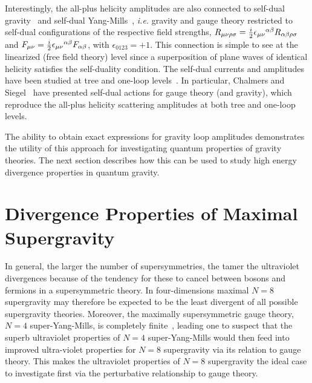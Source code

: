 Interestingly, the all-plus helicity amplitudes are also connected to
self-dual gravity~\cite{Plebanski75,Duff79,Plebanski96} and self-dual
Yang-Mills~\cite{Yang77,DuffIsham80,Lenzov87,Lenzov88,Bardeen96,
Cangemi,ChalmersSiegel}, {\it i.e.} gravity and gauge theory
restricted to self-dual configurations of the respective field
strengths, $R_{\mu\nu\rho\sigma} =
{i\over2}\epsilon_{\mu\nu}{}^{\alpha\beta} R_{\alpha\beta \rho\sigma}$
and $F_{\mu\nu} = {i\over 2} \epsilon_{\mu\nu}{}^{\alpha\beta}
F_{\alpha\beta}$, with $\epsilon_{0123} = +1$.  This connection is
simple to see at the linearized (free field theory) level since a
superposition of plane waves of identical helicity satisfies the
self-duality condition.  The self-dual currents and amplitudes have
been studied at tree and one-loop
levels~\cite{DuffIsham80,Bardeen96,Cangemi,ChalmersSiegel}.  In
particular, Chalmers and Siegel~\cite{ChalmersSiegel} have presented
self-dual actions for gauge theory (and gravity), which reproduce the
all-plus helicity scattering amplitudes at both tree and one-loop
levels.

The ability to obtain exact expressions for gravity loop amplitudes
demonstrates the utility of this approach for investigating quantum
properties of gravity theories.  The next section describes how this
can be used to study high energy divergence properties 
in quantum gravity.


\newpage 
\section{Divergence Properties of Maximal Supergravity}
\label{section:divergence_properties}

In general, the larger the number of supersymmetries, the tamer the
ultraviolet divergences because of the tendency for these to cancel
between bosons and fermions in a supersymmetric theory.  In
four-dimensions maximal $N=8$ supergravity may therefore be expected
to be the least divergent of all possible supergravity
theories. Moreover, the maximally supersymmetric gauge theory, $N=4$
super-Yang-Mills, is completely finite~\cite{Stelle81,Mandelstam83,Howe89},
leading one to suspect that the superb ultraviolet properties of $N=4$
super-Yang-Mills would then feed into improved ultra-violet properties
for $N=8$ supergravity via its relation to gauge theory.  This makes
the ultraviolet properties of $N=8$ supergravity the ideal case to
investigate first via the perturbative relationship to gauge theory.

